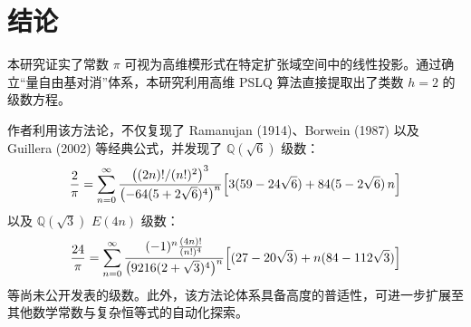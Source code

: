 \documentclass[11pt,a4paper]{ctexart}
\begin{document}
\section{结论}
本研究证实了常数 $\pi$ 可视为高维模形式在特定扩张域空间中的线性投影。通过确立“量自由基对消”体系，本研究利用高维 PSLQ 算法直接提取出了类数 $h=2$ 的级数方程。

作者利用该方法论，不仅复现了 Ramanujan (1914)、Borwein (1987) 以及 Guillera (2002) 等经典公式，并发现了 $\mathbb{Q}(\sqrt{6})$ 级数：
\begin{equation}
\frac{2}{\pi} = \sum_{n=0}^{\infty} \frac{\bigl((2n)!/(n!)^2\bigr)^3}{\bigl(-64(5+2\sqrt{6})^4\bigr)^n} \Bigl[ 3(59 - 24\sqrt{6}) + 84(5 - 2\sqrt{6})\,n \Bigr]
\end{equation}
以及 $\mathbb{Q}(\sqrt{3})$ $E(4n)$ 级数：
\begin{equation}
\frac{24}{\pi} = \sum_{n=0}^{\infty} \frac{(-1)^n \frac{(4n)!}{(n!)^4}}{\bigl(9216(2+\sqrt{3})^4\bigr)^n} \Bigl[ (27 - 20\sqrt{3}) + n(84 - 112\sqrt{3}) \Bigr]
\end{equation}
等尚未公开发表的级数。此外，该方法论体系具备高度的普适性，可进一步扩展至其他数学常数与复杂恒等式的自动化探索。
\end{document}
